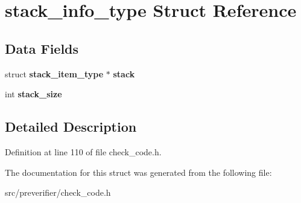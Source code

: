 \section{stack\_\-info\_\-type Struct Reference}
\label{structstack__info__type}
\subsection*{Data Fields}
\begin{DoxyCompactItemize}
\item 
struct {\bf stack\_\-item\_\-type} $\ast$ {\bfseries stack}\label{structstack__info__type_a94a7cb92351014bfed0255c7fdcd59b4}

\item 
int {\bfseries stack\_\-size}\label{structstack__info__type_a472f538066a7caa7580a029414de5de7}

\end{DoxyCompactItemize}


\subsection{Detailed Description}


Definition at line 110 of file check\_\-code.h.



The documentation for this struct was generated from the following file:\begin{DoxyCompactItemize}
\item 
src/preverifier/check\_\-code.h\end{DoxyCompactItemize}
